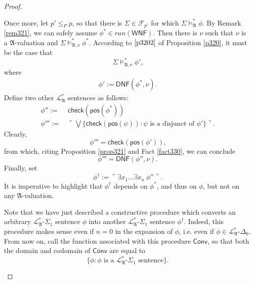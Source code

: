 \documentclass[12pt]{article}
\numberwithin{equation}{section}
\begin{document}
\begin{proof}
\begin{enumerate}[label=Case \arabic*:, leftmargin=50pt]
    Once more, let $p' \leq_{P} p$, so that there is $\Sigma \in \mathcal{F}_{p'}$ for which $\Sigma \models^{*}_{\mathfrak{A}} \phi$. By Remark \ref{rem321}, we can safely assume $\phi^* \in ran(\mathsf{WNF})$. Then there is $\nu$ such that $\nu$ is a $\mathfrak{A}$-valuation and $\Sigma \models^{*}_{\mathfrak{A}, \nu} \phi^*$. According to $\ref{p3202}$ of Proposition \ref{p320}, it must be the case that
    \begin{equation}\label{eq32'}
        \Sigma \models^{*}_{\mathfrak{A}, \nu} \phi'\text{,}
    \end{equation}
    where
    \begin{align*}
        \phi' := \mathsf{DNF}(\phi^*, \nu) \text{.} 
    \end{align*}
    Define two other $\mathcal{L}^{*}_{\mathfrak{A}}$ sentences as follows: 
    \begin{align*}
        \phi'' := \ & \mathsf{check}(\mathsf{pos}(\phi^*)) \\
        \phi''' := \ & \ulcorner \bigvee \{\mathsf{check}(\mathsf{pos}(\psi)) : \psi \text{ is a disjunct of } \phi'\} \urcorner \text{.}
    \end{align*}
    Clearly,  
    \begin{equation*}
        \phi''' = \mathsf{check}(\mathsf{pos}(\phi')) \text{,}
    \end{equation*}
    from which, citing Proposition \ref{prop321} and Fact \ref{fact330}, we can conclude
    \begin{equation}\label{eq32f}
        \phi''' = \mathsf{DNF}(\phi'', \nu) \text{.}
    \end{equation}
    Finally, set
    \begin{equation*}
        \phi^{\dagger} := \ulcorner \exists x_1 \dots \exists x_n \ \phi'' \urcorner \text{.}
    \end{equation*}
    It is imperative to highlight that $\phi^{\dagger}$ depends on $\phi^*$, and thus on $\phi$, but not on any $\mathfrak{A}$-valuation.

    \begin{rem}\label{rem339}
    Note that we have just described a constructive procedure which converts an arbitrary $\mathcal{L}^{*}_{\mathfrak{A}}$-$\Sigma_1$ sentence $\phi$ into another $\mathcal{L}^{*}_{\mathfrak{A}}$-$\Sigma_1$ sentence $\phi^{\dagger}$. Indeed, this procedure makes sense even if $n = 0$ in the expansion of $\phi$, i.e. even if $\phi \in \mathcal{L}^{*}_{\mathfrak{A}}$-$\Delta_0$. From now on, call the function associated with this procedure $\mathsf{Conv}$, so that both the domain and codomain of $\mathsf{Conv}$ are equal to
    \begin{equation*}
        \{\phi: \phi \text{ is a } \mathcal{L}^{*}_{\mathfrak{A}}\text{-}\Sigma_1 \text{ sentence}\} \text{.}
    \end{equation*}
    \end{rem}


\end{enumerate}
\end{proof}
\end{document}
